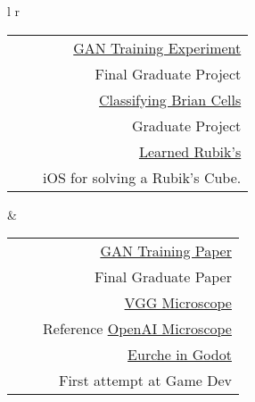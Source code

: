 \setlength{\tabcolsep}{3pt}
\begin{tabular}{l  r}
	\begin{tabular}{l c r}
		\skills{Numpy, python, Torch} & &
		\href{https://nbviewer.org/github/stevenjohnlarsen/GAN-discriminator-refresh-learning/blob/main/GraphsForPaper-No-Feature-Matching.ipynb}
		{GAN Training Experiment} \\
		\skills{} & & Final Graduate Project \\
		
		\skills{Tensorflow, CNN} & & 
		\href{https://nbviewer.org/github/nlarsensmu/CNN/blob/master/Merged%20work.ipynb}
		{Classifying Brian Cells} \\
		\skills{} & & Graduate Project \\
		
		\skills{Something I'm proud of} &  & \href{https://github.com/nlarsensmu/LearnedRubiks}{Learned Rubik's} \\
		\skills{} & & iOS for solving a Rubik's Cube. 
	\end{tabular} & 
	\begin{tabular}{l c r}
		\skills{Technical Writing} & & \href{https://github.com/stevenjohnlarsen/GAN-discriminator-refresh-learning/blob/main/Discriminator_Weight_Stepback.pdf}{GAN Training Paper} \\
		\skills{} & & Final Graduate Paper  \\
		
		\skills{Understanding CNN} & & 
		\href{https://nbviewer.org/github/nlarsensmu/Visualizing-VGG/blob/master/Lab2-Class-Approch.ipynb} 
		{VGG Microscope} \\
		\skills{} & & Reference 
		\href{https://openai.com/research/microscope}{OpenAI Microscope}\\
		
		\skills{Personal Project} & &
		\href{https://github.com/nlarsen31/EurcheGoDot}{Eurche in Godot}\\
		\skills{} & & First attempt at Game Dev  \\
	\end{tabular} \\
\end{tabular}